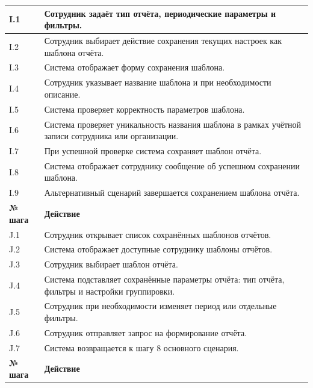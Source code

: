\documentclass[12pt,a4paper]{article}
\begin{document}
\begin{xltabular}{\textwidth}{
				|>{\raggedright\arraybackslash}p{2.7cm}
				|>{\raggedright\arraybackslash}X|
			}
			I.1 & Сотрудник задаёт тип отчёта, периодические параметры и фильтры. \\
			\hline
			I.2 & Сотрудник выбирает действие сохранения текущих настроек как шаблона
			отчёта. \\
			\hline
			I.3 & Система отображает форму сохранения шаблона. \\
			\hline
			I.4 & Сотрудник указывает название шаблона и при необходимости описание. \\
			\hline
			I.5 & Система проверяет корректность параметров шаблона. \\
			\hline
			I.6 & Система проверяет уникальность названия шаблона в рамках учётной
			записи сотрудника или организации. \\
			\hline
			I.7 & При успешной проверке система сохраняет шаблон отчёта. \\
			\hline
			I.8 & Система отображает сотруднику сообщение об успешном сохранении
			шаблона. \\
			\hline
			I.9 & Альтернативный сценарий завершается сохранением шаблона отчёта. \\
			\hline
			
			
			\textbf{№ шага} & \textbf{Действие} \\
			\hline
			
			J.1 & Сотрудник открывает список сохранённых шаблонов отчётов. \\
			\hline
			J.2 & Система отображает доступные сотруднику шаблоны отчётов. \\
			\hline
			J.3 & Сотрудник выбирает шаблон отчёта. \\
			\hline
			J.4 & Система подставляет сохранённые параметры отчёта: тип отчёта,
			фильтры и настройки группировки. \\
			\hline
			J.5 & Сотрудник при необходимости изменяет период или отдельные фильтры. \\
			\hline
			J.6 & Сотрудник отправляет запрос на формирование отчёта. \\
			\hline
			J.7 & Система возвращается к шагу 8 основного сценария. \\
			\hline
			
			
			\textbf{№ шага} & \textbf{Действие} \\
			\hline
			

\end{xltabular}
\end{document}

